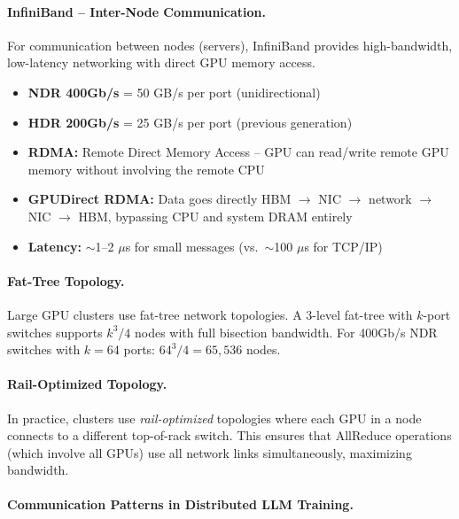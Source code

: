 \paragraph{InfiniBand -- Inter-Node Communication.}
\label{infiniband-inter-node-communication.}

For communication between nodes (servers), InfiniBand provides high-bandwidth, low-latency networking with direct GPU memory access.

\begin{keybox}
\begin{itemize}
  \item \textbf{NDR 400Gb/s} = 50 GB/s per port (unidirectional)
  \item \textbf{HDR 200Gb/s} = 25 GB/s per port (previous generation)
  \item \textbf{RDMA:} Remote Direct Memory Access -- GPU can read/write remote GPU memory without involving the remote CPU
  \item \textbf{GPUDirect RDMA:} Data goes directly HBM $\to$ NIC $\to$ network $\to$ NIC $\to$ HBM, bypassing CPU and system DRAM entirely
  \item \textbf{Latency:} $\sim$1--2 $\mu$s for small messages (vs.~$\sim$100 $\mu$s for TCP/IP)
\end{itemize}
\end{keybox}

\paragraph{Fat-Tree Topology.}
\label{fat-tree-topology.}

Large GPU clusters use fat-tree network topologies. A 3-level fat-tree with $k$-port switches supports $k^3/4$ nodes with full bisection bandwidth. For 400Gb/s NDR switches with $k=64$ ports: $64^3/4 = 65{,}536$ nodes.

\paragraph{Rail-Optimized Topology.}
\label{rail-optimized-topology.}

In practice, clusters use \emph{rail-optimized} topologies where each GPU in a node connects to a different top-of-rack switch. This ensures that AllReduce operations (which involve all GPUs) use all network links simultaneously, maximizing bandwidth.

\paragraph{Communication Patterns in Distributed LLM Training.}
\label{communication-patterns-in-distributed-llm-training.}

